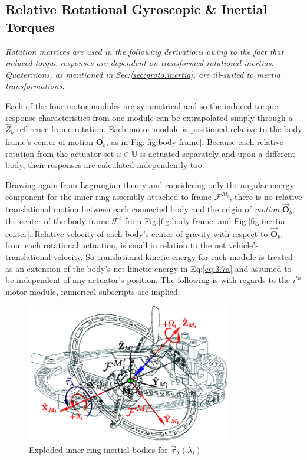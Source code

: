 \subsection{Relative Rotational Gyroscopic \& Inertial Torques}
\label{subsec:dynamics.nonlinearities.gyrotorques}
\emph{\color{gray}Rotation matrices are used in the following derivations owing to the fact that induced torque responses are dependent on transformed rotational inertias. Quaternions, as mentioned in Sec:\ref{sec:proto.inertia}, are ill-suited to inertia transformations.}
\par
Each of the four motor modules are symmetrical and so the induced torque response characteristics from one module can be extrapolated simply through a $\hat{Z}_b$ reference frame rotation. Each motor module is positioned relative to the body frame's center of motion $\vec{\mathbf{O}}_b$, as in Fig:\ref{fig:body-frame}. Because each relative rotation from the actuator set $u\in\mathbb{U}$ is actuated separately and upon a different body, their responses are calculated independently too.
\par
Drawing again from Lagrangian theory and considering only the angular energy component for the inner ring assembly attached to frame $\mathcal{F}^{M_i}$, there is no relative translational motion between each connected body and the origin of \emph{motion} $\vec{\mathbf{O}}_b$, the center of the body frame $\mathcal{F}^b$ from Fig:\ref{fig:body-frame} and Fig:\ref{fig:inertia-center}. Relative velocity of each body's center of gravity with respect to $\vec{\mathbf{O}}_b$, from each rotational actuation, is small in relation to the net vehicle's translational velocity. So translational kinetic energy for each module is treated as an extension of the body's net kinetic energy in Eq:\ref{eq:3.7a} and assumed to be independent of any actuator's position. The following is with regards to the $i^{th}$ motor module, numerical subscripts are implied.
\begin{figure}[htbp]
\vspace{-12pt}
\centering
\includegraphics[width=0.8\textwidth]{figs/response-inner}
\vspace{-8pt}
\caption{Exploded inner ring inertial bodies for $\vec{\tau}_\lambda(\lambda_i)$}
\label{fig:response-inner}
\vspace{-16pt}
\end{figure}
